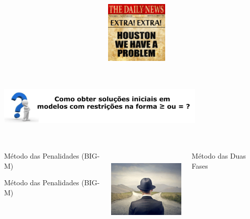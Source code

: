 \begin{frame}
\begin{columns}
\begin{column}{0.5\textwidth}
		\end{column} \pause
		\begin{column}{0.5\textwidth}
			\centering
			\includegraphics[width=3cm,height=3cm]{houston.jpg}
		\end{column}
	\end{columns}
\end{frame}

\begin{frame}
	\centering
	\includegraphics[width=10cm,height=3cm]{Pergunta_Final.png}
	\begin{columns}
		\begin{column}{0.33\textwidth}
			\only<1>
			{
				\begin{mdframed}[backgroundcolor=green!80]
					\centering
					Método das Penalidades (BIG-M)
				\end{mdframed}
			}		
			\only<2>
			{
				\begin{mdframed}[backgroundcolor=red!80]
					\centering
					Método das Penalidades (BIG-M)
				\end{mdframed}
			}		
		\end{column}
		\begin{column}{0.33\textwidth}
			\centering
			\includegraphics[width=4cm,height=4cm]{twoways.jpg}
		\end{column}
		\hspace{0.2cm}
		\begin{column}{0.33\textwidth}
			\begin{mdframed}[backgroundcolor=green!80]
				\centering
				Método das Duas Fases
			\end{mdframed}		
		\end{column}
	\end{columns}
\end{frame}

